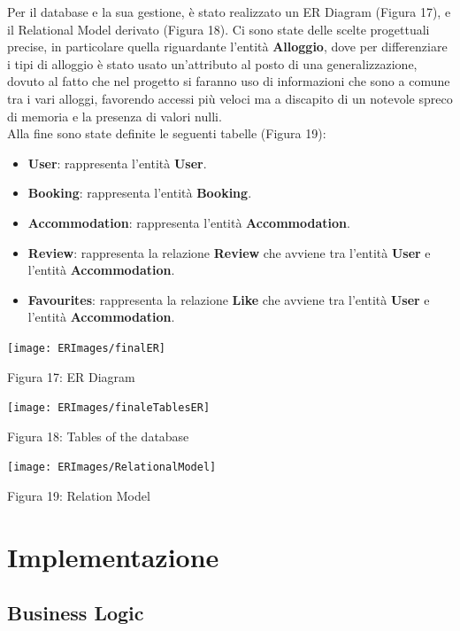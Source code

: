 \documentclass[10pt]{article}
\begin{document}
Per il database e la sua gestione, è stato realizzato un ER Diagram (Figura 17), e il Relational Model derivato (Figura 18). Ci sono state delle scelte progettuali precise, in particolare quella riguardante l'entità \textbf{Alloggio}, dove per differenziare i tipi di alloggio è stato usato un'attributo al posto di una generalizzazione, dovuto al fatto che nel progetto si faranno uso di informazioni che sono a comune tra i vari alloggi, favorendo accessi più veloci ma a discapito di un notevole spreco di memoria e la presenza di valori nulli.\\
Alla fine sono state definite le seguenti tabelle (Figura 19):
\begin{itemize}
\item \textbf{User}: rappresenta l'entità \textbf{User}.
\item \textbf{Booking}: rappresenta l'entità \textbf{Booking}.
\item \textbf{Accommodation}: rappresenta l'entità \textbf{Accommodation}.
\item \textbf{Review}: rappresenta la relazione \textbf{Review} che avviene tra l'entità \textbf{User} e l'entità \textbf{Accommodation}.
\item \textbf{Favourites}: rappresenta la relazione \textbf{Like} che avviene tra l'entità \textbf{User} e l'entità \textbf{Accommodation}.
\end{itemize}

\begin{center}
\par\medskip
\texttt{[image: ERImages/finalER]}
\par\medskip
Figura 17: ER Diagram
\par\medskip
\texttt{[image: ERImages/finaleTablesER]}
\par\medskip
Figura 18: Tables of the database
\par\medskip
\texttt{[image: ERImages/RelationalModel]}
\par\medskip
Figura 19: Relation Model
\par\medskip
\end{center}

\section{Implementazione}
\subsection{Business Logic}
\end{document}
